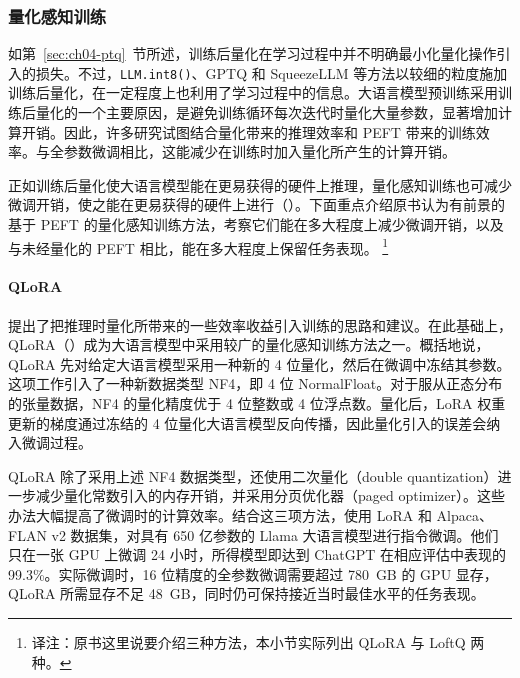 
\subsubsection{量化感知训练}
\label{sec:ch04-qat}
如第~\ref{sec:ch04-ptq}~节所述，训练后量化在学习过程中并不明确最小化量化操作引入的损失。不过，\texttt{LLM.int8()}、GPTQ 和 SqueezeLLM 等方法以较细的粒度施加训练后量化，在一定程度上也利用了学习过程中的信息。大语言模型预训练采用训练后量化的一个主要原因，是避免训练循环每次迭代时量化大量参数，显著增加计算开销。因此，许多研究试图结合量化带来的推理效率和 PEFT 带来的训练效率。与全参数微调相比，这能减少在训练时加入量化所产生的计算开销。

正如训练后量化使大语言模型能在更易获得的硬件上推理，量化感知训练也可减少微调开销，使之能在更易获得的硬件上进行（）。下面重点介绍原书认为有前景的基于 PEFT 的量化感知训练方法，考察它们能在多大程度上减少微调开销，以及与未经量化的 PEFT 相比，能在多大程度上保留任务表现。%
\footnote{译注：原书这里说要介绍三种方法，本小节实际列出 QLoRA 与 LoftQ 两种。}

\paragraph*{QLoRA}
提出了把推理时量化所带来的一些效率收益引入训练的思路和建议。在此基础上，QLoRA（）成为大语言模型中采用较广的量化感知训练方法之一。概括地说，QLoRA 先对给定大语言模型采用一种新的 4 位量化，然后在微调中冻结其参数。这项工作引入了一种新数据类型 NF4，即 4 位 NormalFloat。对于服从正态分布的张量数据，NF4 的量化精度优于 4 位整数或 4 位浮点数。量化后，LoRA 权重更新的梯度通过冻结的 4 位量化大语言模型反向传播，因此量化引入的误差会纳入微调过程。

QLoRA 除了采用上述 NF4 数据类型，还使用二次量化（double quantization）进一步减少量化常数引入的内存开销，并采用分页优化器（paged optimizer）。这些办法大幅提高了微调时的计算效率。结合这三项方法，使用 LoRA 和 Alpaca、FLAN v2 数据集，对具有 650 亿参数的 Llama 大语言模型进行指令微调。他们只在一张 GPU 上微调 24 小时，所得模型即达到 ChatGPT 在相应评估中表现的 99.3\%。实际微调时，16 位精度的全参数微调需要超过 780~GB 的 GPU 显存，QLoRA 所需显存不足 48~GB，同时仍可保持接近当时最佳水平的任务表现。

